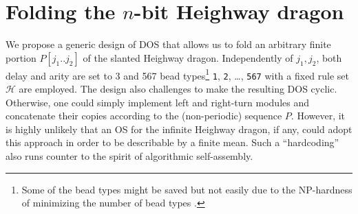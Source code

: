 \documentclass[runningheads]{llncs}
\begin{document}
	\section{Folding the $n$-bit Heighway dragon}

We propose a generic design of DOS that allows us to fold an arbitrary finite portion $P[j_1 .. j_2]$ of the slanted Heighway dragon. 
Independently of $j_1, j_2$, both delay and arity are set to 3 and 567 bead types\footnote{Some of the bead types might be saved but not easily due to the NP-hardness of minimizing the number of bead types \cite{HanKim2017}.} \texttt{1}, \texttt{2}, \dots, \texttt{567} with a fixed rule set $\mathcal{H}$ are employed. 
The design also challenges to make the resulting DOS cyclic. 
Otherwise, one could simply implement left and right-turn modules and concatenate their copies according to the (non-periodic) sequence $P$. 
However, it is highly unlikely that an OS for the infinite Heighway dragon, if any, could adopt this approach in order to be describable by a finite mean. 
Such a ``hardcoding'' also runs counter to the spirit of algorithmic self-assembly. 
\end{document}
